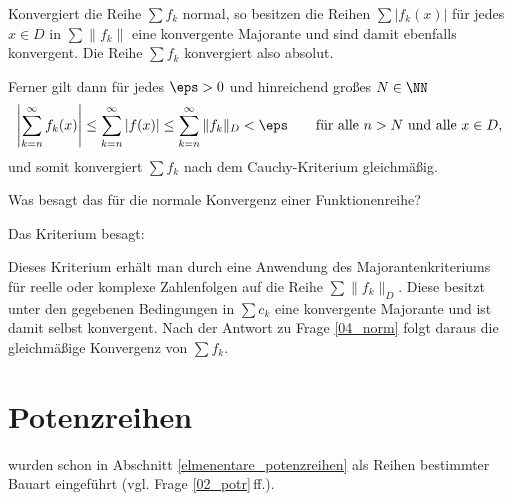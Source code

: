 \begin{antwort}
 Konvergiert die Reihe $\sum f_k$ normal, so besitzen die 
Reihen $\sum | f_k(x) |$ für jedes $x\in D$ in $\sum \| f_k \|$ eine 
konvergente Majorante und sind damit ebenfalls konvergent. Die Reihe 
$\sum f_k$ konvergiert also absolut.

Ferner gilt dann für jedes $\eps>0$ und hinreichend großes $N\in\NN$ 
\[
\left| \sum_{k=n}^\infty f_k(x) \right| \le 
\sum_{k=n}^\infty | f(x) | \le
\sum_{k=n}^\infty \| f_k \|_D < \eps\qquad 
\text{für alle $n>N$ und alle $x\in D$},
\]
und somit konvergiert $\sum f_k$ nach dem Cauchy-Kriterium gleichmäßig.
\AntEnd 
\end{antwort}

\begin{frage}
Was besagt das  für die 
normale Konvergenz einer Funktionenreihe?
\end{frage}

\begin{antwort}
Das Kriterium besagt: 

\medskip\noindent
{}

\medskip\noindent
Dieses Kriterium erhält man durch eine Anwendung  
des Majorantenkriteriums für reelle oder 
komplexe Zahlenfolgen auf die Reihe $\sum \| f_k \|_D$. 
Diese besitzt unter den gegebenen Bedingungen in $\sum c_k$ eine 
konvergente Majorante und ist damit selbst konvergent. 
Nach der Antwort zu Frage \ref{04_norm} 
folgt daraus die gleichmäßige Konvergenz von $\sum f_k$.\AntEnd
\end{antwort} 
  

\section{Potenzreihen}

 wurden schon in Abschnitt 
\ref{elmenentare_potenzreihen} als Reihen 
bestimmter Bauart eingeführt (vgl. Frage \ref{02_potr}\,ff.).

